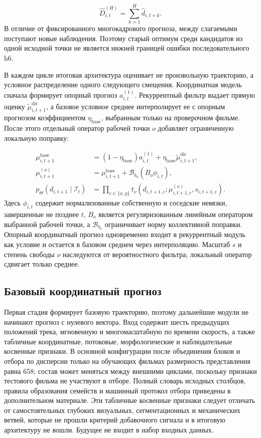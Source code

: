\documentclass[11pt,a4paper]{article}
\begin{document}
\begin{equation}
\widehat D_{i,t}^{(H)}=\sum_{k=1}^{H}\widehat d_{i,t+k}.
\end{equation}
В отличие от фиксированного многокадрового прогноза, между слагаемыми поступают новые наблюдения. Поэтому старый оптимум среди кандидатов из одной исходной точки не является нижней границей ошибки последовательного h6.

В каждом цикле итоговая архитектура оценивает не произвольную траекторию, а условное распределение одного следующего смещения. Координатная модель сначала формирует опорный прогноз $a_{i,t}^{(1)}$. Рекуррентный фильтр выдает прямую оценку $\widetilde\mu^{\mathrm{dir}}_{i,t+1}$, а базовое условное среднее интерполирует ее с опорным прогнозом коэффициентом $\eta_{\mathrm{base}}$, выбранным только на проверочном фильме. После этого отдельный оператор рабочей точки $o$ добавляет ограниченную локальную поправку:

\begin{equation}
\begin{aligned}
\mu^{\mathrm{base}}_{i,t+1}
&=(1-\eta_{\mathrm{base}})a_{i,t}^{(1)}
+\eta_{\mathrm{base}}\widetilde\mu^{\mathrm{dir}}_{i,t+1},\\
\mu^{(o)}_{i,t+1}
&=\mu^{\mathrm{base}}_{i,t+1}
+\mathcal B_{b_o}\!\left(B_o\phi_{i,t}\right),\\
p_\Theta(d_{i,t+1}\mid\mathcal I_t)
&=\prod_{c\in\{x,y\}}
t_\nu\!\left(d_{i,t+1,c};\mu^{(o)}_{i,t+1,c},s_{i,t+1,c}\right).
\end{aligned}
\end{equation}
Здесь $\phi_{i,t}$ содержит нормализованные собственную и соседские невязки, завершенные не позднее $t$, $B_o$ является регуляризованным линейным оператором выбранной рабочей точки, а $\mathcal B_{b_o}$ ограничивает норму коллективной поправки. Опорный координатный прогноз одновременно входит в рекуррентный модуль как условие и остается в базовом среднем через интерполяцию. Масштаб $s$ и степень свободы $\nu$ наследуются от вероятностного фильтра; локальный оператор сдвигает только среднее.

\subsection{Базовый координатный прогноз}
Первая стадия формирует базовую траекторию, поэтому дальнейшие модули не начинают прогноз с нулевого вектора. Вход содержит шесть предыдущих положений трека, мгновенную и многомасштабную по времени скорость, а также табличные координатные, потоковые, морфологические и наблюдательные косвенные признаки. В основной конфигурации после объединения блоков и отбора по дисперсии только на обучающих фильмах размерность представления равна 658; состав может меняться между внешними циклами, поскольку признаки тестового фильма не участвуют в отборе. Полный словарь исходных столбцов, правила образования семейств и машинный протокол отбора приведены в дополнительном материале. Эти табличные косвенные признаки следует отличать от самостоятельных глубоких визуальных, сегментационных и механических ветвей, которые не прошли критерий добавочного сигнала и в итоговую архитектуру не вошли. Будущее не входит в набор входных данных.
\end{document}

